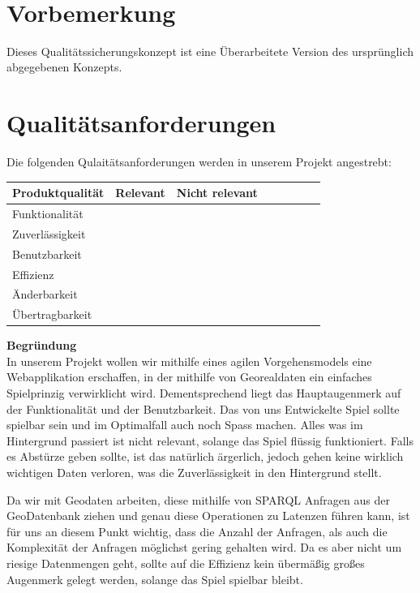 \documentclass[11pt,a4paper]{article}
\newcommand{\cmark}{\ding{51}}%
\begin{document}
 \\

\tableofcontents

\flushleft
\section{Vorbemerkung}
Dieses Qualitätssicherungskonzept ist eine Überarbeitete Version des ursprünglich abgegebenen Konzepts.
\section{Qualitätsanforderungen}
Die folgenden Qulaitätsanforderungen werden in unserem Projekt angestrebt:
\begin{center}
    \begin{tabular}{ | l | c | c | c | c | c | c | c | }
    \hline
     Produktqualität & Relevant & Nicht relevant \\ \hline
	 Funktionalität   & \cmark & \\ \hline
	 Zuverlässigkeit  &  & \cmark  \\ \hline	
	 Benutzbarkeit & \cmark &  \\ \hline
	 Effizienz & & \cmark  \\ \hline
	 Änderbarkeit &  \cmark &  \\ \hline
	 Übertragbarkeit &  \cmark & \\ \hline
	 
    \end{tabular}
\end{center}
\textbf{Begründung} \\
In unserem Projekt wollen wir mithilfe eines agilen Vorgehensmodels eine Webapplikation erschaffen, in der mithilfe von Georealdaten ein einfaches Spielprinzig verwirklicht wird. 
Dementsprechend liegt das Hauptaugenmerk auf der Funktionalität und der Benutzbarkeit.
Das von uns Entwickelte Spiel sollte spielbar sein und im Optimalfall auch noch Spass machen.
Alles was im Hintergrund passiert ist nicht relevant, solange das Spiel flüssig funktioniert.
Falls es Abstürze geben sollte, ist das natürlich ärgerlich, jedoch gehen keine wirklich wichtigen Daten verloren, was die Zuverlässigkeit in den Hintergrund stellt.

Da wir mit Geodaten arbeiten, diese mithilfe von SPARQL Anfragen aus der GeoDatenbank ziehen und genau diese Operationen zu Latenzen führen kann, ist für uns an diesem Punkt wichtig, dass die Anzahl der Anfragen, als auch die Komplexität der Anfragen möglichst gering gehalten wird.
Da es aber nicht um riesige Datenmengen geht, sollte auf die Effizienz kein übermäßig großes Augenmerk gelegt werden, solange das Spiel spielbar bleibt.
\end{document}
